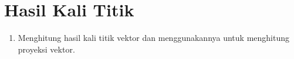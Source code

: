 \section{Hasil Kali Titik}

\begin{outcome}

\begin{enumerate}
\item[A.] Menghitung hasil kali titik vektor dan menggunakannya untuk menghitung proyeksi vektor.
\end{enumerate}
\end{outcome}
